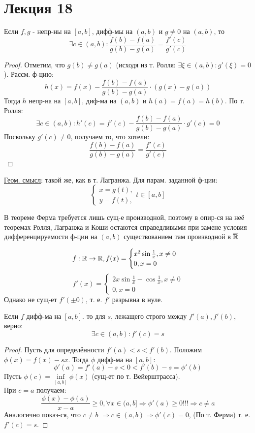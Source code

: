 \section{Лекция 18}
\begin{theorem}[Коши]
 Если $f, g$ - непр-ны на $[a, b]$, дифф-мы на $(a, b)$ и $g \neq 0$ на $(a, b)$, то
 \[
   \exists c \in (a, b) \colon \frac{f(b) - f(a)}{g(b) - g(a)} = \frac{f'(c)}{g'(c)}
 \]
\end{theorem}
\begin{proof}
Отметим, что $g(b) \neq g(a)$ (исходя из т. Ролля: $\exists \xi \in (a, b) \colon g'(\xi) = 0$). Рассм. ф-цию:
\[
h(x) = f(x) - \frac{f(b) - f(a)}{g(b) - g(a)} \cdot (g(x) - g(a))
\]
Тогда $h$ непр-на на $[a, b]$, диф-ма на $(a, b)$ и $h(a) = f(a) = h(b)$. По т. Ролля:
\[
\exists c \in (a, b) \colon h'(c) = f'(c) - \frac{f(b) - f(a)}{g(b) - g(a)} \cdot g'(c) = 0
\]
Поскольку $g'(c) \neq 0$, получаем то, что хотели:
\[
  \frac{f(b) - f(a)}{g(b) - g(a)} = \frac{f'(c)}{g'(c)}
\]
\end{proof}
\underline{Геом. смысл}: такой же, как в т. Лагранжа. Для парам. заданной ф-ции:
\[
\begin{cases}
x = g(t), \\
y = f(t),
\end{cases} t\in [a, b]
\]
\begin{note}
В теореме Ферма требуется лишь сущ-е производной, поэтому в опир-ся на неё теоремах Ролля, Лагранжа и Коши остаются справедливыми при замене условия дифференцируемости ф-ции на $(a, b)$ существованием там производной в $\overline{\mathbb{R}}$ 
\end{note}
\begin{example}
\[
f: \mathbb{R} \rightarrow \mathbb{R}, f(x) = \begin{cases}
x^{2}\sin \frac{1}{x}, x \neq 0 \\
0, x = 0
\end{cases}
\]
\[
f'(x) = \begin{cases}
2x \sin \frac{1}{x} - \cos \frac{1}{x}, x \neq 0 \\
0, x = 0
\end{cases}
\]
Однако не сущ-ет $f'(\pm 0)$, т. е. $f'$ разрывна в нуле.
\end{example}
\begin{theorem}[Дарбу]
Если $f$ дифф-ма на $[a, b]$. то для $s$, лежащего строго между $f'(a), f'(b)$, верно:
\[
  \exists c \in (a, b) \colon f'(c) = s
\]
\end{theorem}
\begin{proof}
Пусть для определённости $f'(a) < s < f'(b)$. Положим $\phi(x) = f(x) - sx$. Тогда $\phi$ дифф-ма на $[a, b]$:
\[
\phi'(a) = f'(a) - s < 0 < f'(b) - s = \phi'(b)
\]
Пусть $\phi(c) = \underset{[a, b]}{\inf} \phi(x)$ (сущ-ет по т. Вейерштрасса). \\
При $c = a$ получаем:
\[
  \frac{\phi(x) - \phi(a)}{x - a} \geq 0, \forall x \in (a, b] \Rightarrow \phi'(a) \geq 0!!! \Rightarrow c \neq a
\]
Аналогично показ-ся, что $c \neq b$ $\Rightarrow c \in (a, b) \Rightarrow \phi'(c) = 0$, (По т. Ферма) т. е. $f'(c) = s$.
\end{proof}
